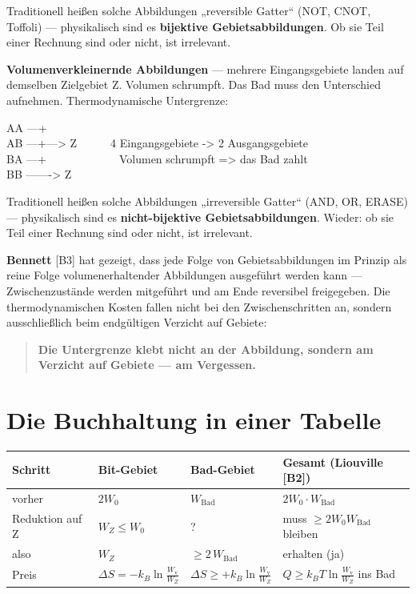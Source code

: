 Traditionell heißen solche Abbildungen „reversible Gatter“ (NOT, CNOT, Toffoli)
--- physikalisch sind es \textbf{bijektive Gebietsabbildungen}. Ob sie Teil einer
Rechnung sind oder nicht, ist irrelevant.

\LB \textbf{Volumenverkleinernde Abbildungen} --- mehrere Eingangsgebiete landen
auf demselben Zielgebiet Z. Volumen schrumpft. Das Bad muss den Unterschied
aufnehmen. Thermodynamische Untergrenze:

\begin{center}
\begin{minipage}{0.75\textwidth}
\ttfamily\small
AA ---+\\
AB ---+---> Z\ \ \ \ \ \ 4 Eingangsgebiete -> 2 Ausgangsgebiete\\
BA ---+\ \ \ \ \ \ \ \ \ \ \ \ \ Volumen schrumpft => das Bad zahlt\\
BB -------> Z
\end{minipage}
\end{center}

Traditionell heißen solche Abbildungen „irreversible Gatter“ (AND, OR, ERASE) ---
physikalisch sind es \textbf{nicht-bijektive Gebietsabbildungen}. Wieder: ob sie
Teil einer Rechnung sind oder nicht, ist irrelevant.

\LB \textbf{Bennett} [B3] hat gezeigt, dass jede Folge von Gebietsabbildungen im
Prinzip als reine Folge volumenerhaltender Abbildungen ausgeführt werden kann ---
Zwischenzustände werden mitgeführt und am Ende reversibel freigegeben. Die
thermodynamischen Kosten fallen nicht bei den Zwischenschritten an, sondern
ausschließlich beim endgültigen Verzicht auf Gebiete:

\begin{quote}
\LB \textbf{Die Untergrenze klebt nicht an der Abbildung, sondern am Verzicht auf
Gebiete --- am Vergessen.}
\end{quote}

\section{Die Buchhaltung in einer Tabelle}

\begin{center}
\small
\begin{tabular}{@{}llll@{}}
\toprule
\textbf{Schritt} & \textbf{Bit-Gebiet} & \textbf{Bad-Gebiet} & \textbf{Gesamt (Liouville [B2])} \\
\midrule
vorher & $2W_0$ & $W_{\text{Bad}}$ & $2W_0 \cdot W_{\text{Bad}}$ \\
Reduktion auf Z & $W_Z \le W_0$ & ? & muss $\ge 2W_0 W_{\text{Bad}}$ bleiben \\
also & $W_Z$ & $\ge 2\,W_{\text{Bad}}$ & erhalten (ja) \\
Preis & $\Delta S = -k_B \ln\frac{W_{\text{v}}}{W_Z}$ & $\Delta S \ge +k_B \ln\frac{W_{\text{v}}}{W_Z}$ & $Q \ge k_B T \ln\frac{W_{\text{v}}}{W_Z}$ ins Bad \\
\bottomrule
\end{tabular}
\end{center}

